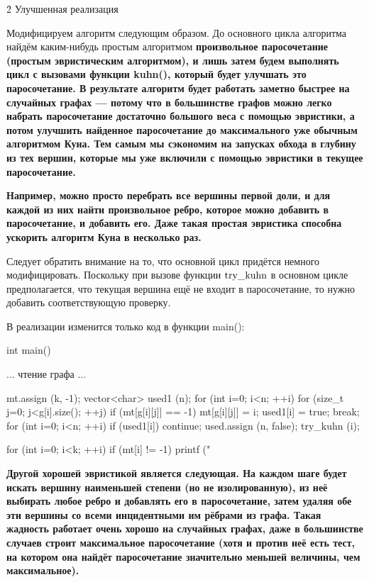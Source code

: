 \h2{ Улучшенная реализация }

Модифицируем алгоритм следующим образом. До основного цикла алгоритма найдём каким-нибудь простым алгоритмом \bf{произвольное паросочетание} (простым \bf{эвристическим алгоритмом}), и лишь затем будем выполнять цикл с вызовами функции kuhn(), который будет улучшать это паросочетание. В результате алгоритм будет работать заметно быстрее на случайных графах --- потому что в большинстве графов можно легко набрать паросочетание достаточно большого веса с помощью эвристики, а потом улучшить найденное паросочетание до максимального уже обычным алгоритмом Куна. Тем самым мы сэкономим на запусках обхода в глубину из тех вершин, которые мы уже включили с помощью эвристики в текущее паросочетание.

\bf{Например}, можно просто перебрать все вершины первой доли, и для каждой из них найти произвольное ребро, которое можно добавить в паросочетание, и добавить его. Даже такая простая эвристика способна ускорить алгоритм Куна в несколько раз.

Следует обратить внимание на то, что основной цикл придётся немного модифицировать. Поскольку при вызове функции $\rm try\_kuhn$ в основном цикле предполагается, что текущая вершина ещё не входит в паросочетание, то нужно добавить соответствующую проверку.

В реализации изменится только код в функции main():

\code
int main() {
	... чтение графа ...

	mt.assign (k, -1);
	vector<char> used1 (n);
	for (int i=0; i<n; ++i)
		for (size_t j=0; j<g[i].size(); ++j)
			if (mt[g[i][j]] == -1) {
				mt[g[i][j]] = i;
				used1[i] = true;
				break;
			}
	for (int i=0; i<n; ++i) {
		if (used1[i])  continue;
		used.assign (n, false);
		try_kuhn (i);
	}

	for (int i=0; i<k; ++i)
		if (mt[i] != -1)
			printf ("%
}
\endcode

\bf{Другой хорошей эвристикой} является следующая. На каждом шаге будет искать вершину наименьшей степени (но не изолированную), из неё выбирать любое ребро и добавлять его в паросочетание, затем удаляя обе эти вершины со всеми инцидентными им рёбрами из графа. Такая жадность работает очень хорошо на случайных графах, даже в большинстве случаев строит максимальное паросочетание (хотя и против неё есть тест, на котором она найдёт паросочетание значительно меньшей величины, чем максимальное).
